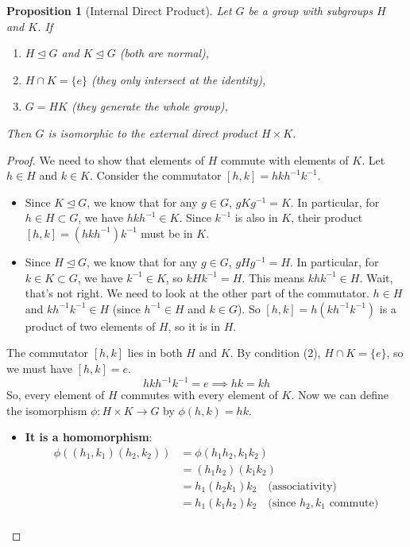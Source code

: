 \documentclass[12pt,a4paper]{article}
\theoremstyle{plain} %
\newtheorem{proposition}[theorem]{Proposition}
\theoremstyle{definition} %
\theoremstyle{remark} %
\begin{document}
\begin{proposition}[Internal Direct Product]
Let $G$ be a group with subgroups $H$ and $K$. If
\begin{enumerate}
    \item $H \unlhd G$ and $K \unlhd G$ (both are normal),
    \item $H \cap K = \{e\}$ (they only intersect at the identity),
    \item $G = HK$ (they generate the whole group),
\end{enumerate}
Then $G$ is isomorphic to the external direct product $H \times K$.
\end{proposition}

\begin{proof}
We need to show that elements of $H$ commute with elements of $K$. Let $h \in H$ and $k \in K$. Consider the commutator $[h,k] = hkh^{-1}k^{-1}$.
\begin{itemize}
    \item Since $K \unlhd G$, we know that for any $g \in G$, $gKg^{-1} = K$. In particular, for $h \in H \subset G$, we have $hkh^{-1} \in K$. Since $k^{-1}$ is also in $K$, their product $[h,k] = (hkh^{-1})k^{-1}$ must be in $K$.
    \item Since $H \unlhd G$, we know that for any $g \in G$, $gHg^{-1} = H$. In particular, for $k \in K \subset G$, we have $k^{-1} \in K$, so $kHk^{-1}=H$. This means $khk^{-1} \in H$. Wait, that's not right. We need to look at the other part of the commutator. $h \in H$ and $k h^{-1} k^{-1} \in H$ (since $h^{-1} \in H$ and $k \in G$). So $[h,k] = h(kh^{-1}k^{-1})$ is a product of two elements of $H$, so it is in $H$.
\end{itemize}
The commutator $[h,k]$ lies in both $H$ and $K$. By condition (2), $H \cap K = \{e\}$, so we must have $[h,k] = e$.
\[
hkh^{-1}k^{-1} = e \implies hk = kh
\]
So, every element of $H$ commutes with every element of $K$. Now we can define the isomorphism $\phi: H \times K \to G$ by $\phi(h,k) = hk$.
\begin{itemize}
    \item \textbf{It is a homomorphism}:
    \begin{align*}
    \phi((h_1, k_1)(h_2, k_2)) &= \phi(h_1h_2, k_1k_2) \\
                              &= (h_1h_2)(k_1k_2) \\
                              &= h_1(h_2k_1)k_2 \quad \text{(associativity)} \\
                              &= h_1(k_1h_2)k_2 \quad \text{(since } h_2, k_1 \text{ commute)} \\

\end{align*}
\end{itemize}
\end{proof}
\end{document}
